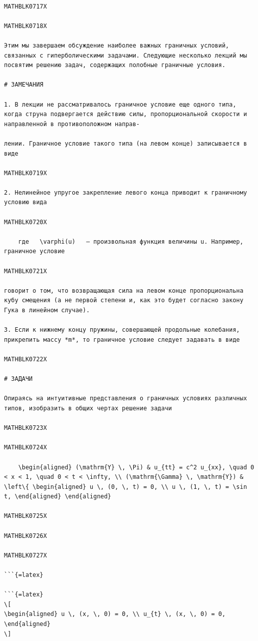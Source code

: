 \documentclass[
]{article}
\begin{document}
\begin{verbatim}

MATHBLK0717X

MATHBLK0718X

Этим мы завершаем обсуждение наиболее важных граничных условий, связанных с гиперболическими задачами. Следующие несколько лекций мы посвятим решению задач, содержащих полобные граничные условия.

# ЗАМЕЧАНИЯ

1. В лекции не рассматривалось граничное условие еще одного типа, когда струна подвергается действию силы, пропорциональной скорости и направленной в противоположном направ-

лении. Граничное условие такого типа (на левом конце) записывается в виде

MATHBLK0719X

2. Нелинейное упругое закрепление левого конца приводит к граничному условию вида

MATHBLK0720X

    где   \varphi(u)   — произвольная функция величины u. Например, граничное условие

MATHBLK0721X

говорит о том, что возвращающая сила на левом конце пропорциональна кубу смещения (а не первой степени и, как это будет согласно закону Гука в линейном случае).

3. Если к нижнему концу пружины, совершающей продольные колебания, прикрепить массу *m*, то граничное условие следует задавать в виде

MATHBLK0722X

# ЗАДАЧИ

Опираясь на интуитивные представления о граничных условиях различных типов, изобразить в общих чертах решение задачи

MATHBLK0723X

MATHBLK0724X

    \begin{aligned} (\mathrm{Y} \, \Pi) & u_{tt} = c^2 u_{xx}, \quad 0 < x < 1, \quad 0 < t < \infty, \\ (\mathrm{\Gamma} \, \mathrm{Y}) & \left\{ \begin{aligned} u \, (0, \, t) = 0, \\ u \, (1, \, t) = \sin t, \end{aligned} \end{aligned}

MATHBLK0725X

MATHBLK0726X

MATHBLK0727X

```{=latex}

```{=latex}
\[
\begin{aligned} u \, (x, \, 0) = 0, \\ u_{t} \, (x, \, 0) = 0, \end{aligned}
\]
\end{verbatim}
\end{document}
